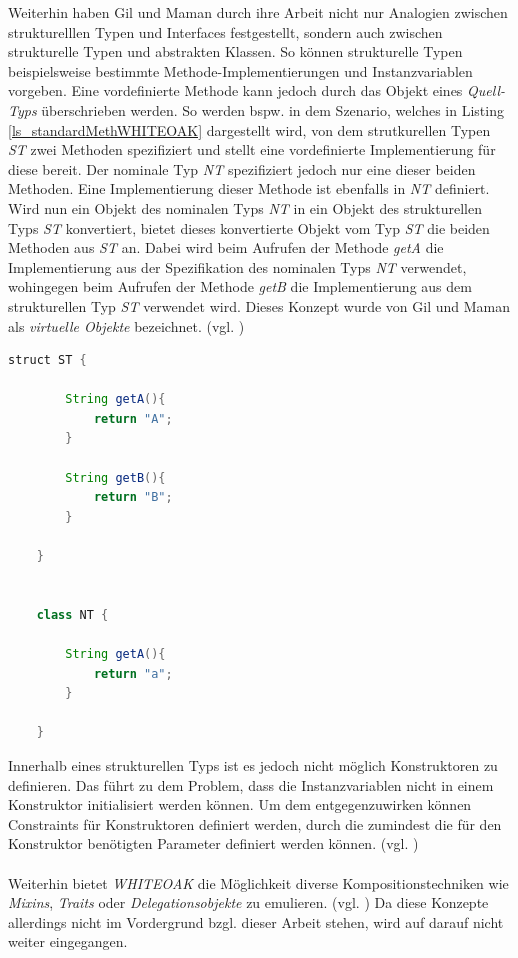 \documentclass[11pt, 
ngerman,
doublespacing,
chapterinoneline, %
consistentlayout, %
]{scrartcl}
\begin{document}
Weiterhin haben Gil und Maman \cite{whiteoak} durch ihre Arbeit nicht nur Analogien zwischen strukturelllen Typen und Interfaces festgestellt, sondern auch zwischen strukturelle Typen und abstrakten Klassen. So können strukturelle Typen beispielsweise bestimmte Methode-Implementierungen und Instanzvariablen vorgeben. Eine vordefinierte Methode kann jedoch durch das Objekt eines \emph{Quell-Typs} überschrieben werden. So werden bspw. in dem Szenario, welches in Listing \ref{ls_standardMethWHITEOAK} dargestellt wird, von dem strutkurellen Typen \emph{ST} zwei Methoden spezifiziert und stellt eine vordefinierte Implementierung für diese bereit. Der nominale Typ \emph{NT} spezifiziert jedoch nur eine dieser beiden Methoden. Eine Implementie\-rung dieser Methode ist ebenfalls in \emph{NT} definiert. Wird nun ein Objekt des nominalen Typs \emph{NT} in ein Objekt des strukturellen Typs \emph{ST} konvertiert, bietet dieses konvertierte Objekt vom Typ \emph{ST} die beiden Methoden aus \emph{ST} an. Dabei wird beim Aufrufen der Methode \emph{getA} die Implementierung aus der Spezifikation des nominalen Typs \emph{NT} verwendet, wohingegen beim Aufrufen der Methode \emph{getB} die Implementierung aus dem strukturellen Typ \emph{ST} verwendet wird. Dieses Konzept wurde von Gil und Maman als \emph{virtuelle Objekte} bezeichnet. (vgl. \cite{whiteoak})\\
\begin{lstlisting}[caption =Standardmethoden in WHITEOAK, language=Java, label=ls_standardMethWHITEOAK ]
	struct ST {
	
		String getA(){
			return "A";
		}
		
		String getB(){
			return "B";
		}

	}

	
	class NT {

		String getA(){
			return "a";
		}	

	}
\end{lstlisting}
Innerhalb eines strukturellen Typs ist es jedoch nicht möglich Konstruktoren zu definieren. Das führt zu dem Problem, dass die Instanzvariablen nicht in einem Konstruktor initiali\-siert werden können. Um dem entgegenzuwirken können Constraints für Konstruktoren definiert werden, durch die zumindest die für den Konstruktor benötigten Parameter definiert werden können. (vgl. \cite{whiteoak})\\\\
Weiterhin bietet \emph{WHITEOAK} die Möglichkeit diverse Kompositionstechniken wie \linebreak\emph{Mixins}, \emph{Traits} oder \emph{Delegationsobjekte} zu emulieren. (vgl. \cite{whiteoak}) Da diese Konzepte aller\-dings nicht im Vordergrund bzgl. dieser Arbeit stehen, wird auf darauf nicht weiter eingegangen.\\\\
\end{document}
